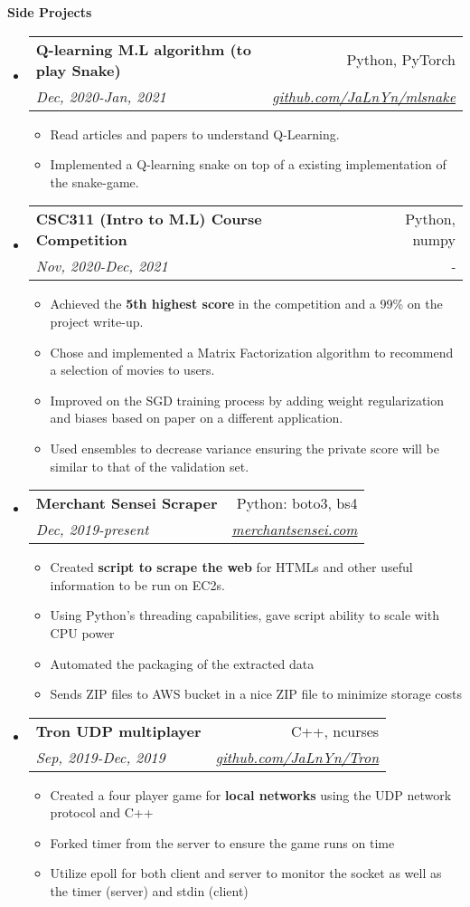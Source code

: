 \documentclass[letterpaper,12pt]{article}[leftmargin=*]
\makeatletter
\def \entryspacing {-0pt}
\renewcommand{\section}[2]{\vspace{5pt}
  \colorbox{secondary}{\color{white}\raggedbottom\normalsize\textbf{{#1}{\hspace{7pt}#2}}}
}
\newcommand{\resumeEntryStart}{\begin{itemize}[leftmargin=2.5mm]}
\newcommand{\resumeEntryEnd}{\end{itemize}\vspace{\entryspacing}}
\newcommand{\resumeItemListStart}{\begin{itemize}[leftmargin=4.5mm]}
\newcommand{\resumeItemListEnd}{\end{itemize}}
\newcommand{\resumeItem}[1]{
  \item\small{
    {#1 \vspace{-2pt}}
  }
}
\newcommand{\resumeEntryTSDL}[4]{
  \vspace{-1pt}\item[]
    \begin{tabularx}{0.97\textwidth}{X@{\hspace{60pt}}r}
      \textbf{\color{primary}#1} & {\firabook\color{accent}\small#2} \\
      \textit{\color{accent}\small#3} & \textit{\color{accent}\small#4} \\
    \end{tabularx}\vspace{-6pt}
}
\makeatother
\begin{document}
\section{\faFlask}{Side Projects}
  \resumeEntryStart
    \resumeEntryTSDL
	  {Q-learning M.L algorithm (to play Snake)}{Python, PyTorch}{Dec, 2020-Jan, 2021}{\href{https://github.com/JaLnYn/}{github.com/JaLnYn/mlsnake}}
    \resumeItemListStart
      \resumeItem {Read articles and papers to understand Q-Learning.}
      \resumeItem {Implemented a Q-learning snake on top of a existing implementation of the snake-game.}
    \resumeItemListEnd
  \resumeEntryEnd 
  \resumeEntryStart
    \resumeEntryTSDL
	  {CSC311 (Intro to M.L) Course Competition}{Python, numpy}{Nov, 2020-Dec, 2021}{-}
    \resumeItemListStart
	  \resumeItem {Achieved the \textbf{5th highest score} in the competition and a 99\% on the project write-up.}
      \resumeItem {Chose and implemented a Matrix Factorization algorithm to recommend a selection of movies to users.}
      \resumeItem {Improved on the SGD training process by adding weight regularization and biases based on paper on a different application.}
      \resumeItem {Used ensembles to decrease variance ensuring the private score will be similar to that of the validation set.}
    \resumeItemListEnd
  \resumeEntryEnd 
  \resumeEntryStart
    \resumeEntryTSDL
      {Merchant Sensei Scraper}{ Python: boto3, bs4}{ Dec, 2019-present}{\href{https://merchantsensei.com/}{merchantsensei.com}}{}{}
    \resumeItemListStart
	  \resumeItem {Created \textbf{script to scrape the web} for HTMLs and other useful information to be run on EC2s.}
      \resumeItem {Using Python's threading capabilities, gave script ability to scale with CPU power}
      \resumeItem {Automated the packaging of the extracted data} 
      \resumeItem {Sends ZIP files to AWS bucket in a nice ZIP file to minimize storage costs}
    \resumeItemListEnd
  \resumeEntryEnd


  \resumeEntryStart
    \resumeEntryTSDL
      {Tron UDP multiplayer}{C++, ncurses}{Sep, 2019-Dec, 2019}{\href{https://github.com/JaLnYn/Tron}{github.com/JaLnYn/Tron}}
    \resumeItemListStart
	\resumeItem {Created a four player game for \textbf{local networks} using the UDP network protocol and C++}
    \resumeItem {Forked timer from the server to ensure the game runs on time}
    \resumeItem {Utilize epoll for both client and server to monitor the socket as well as the timer (server) and stdin (client)}
    \resumeItemListEnd
  \resumeEntryEnd
\end{document}
